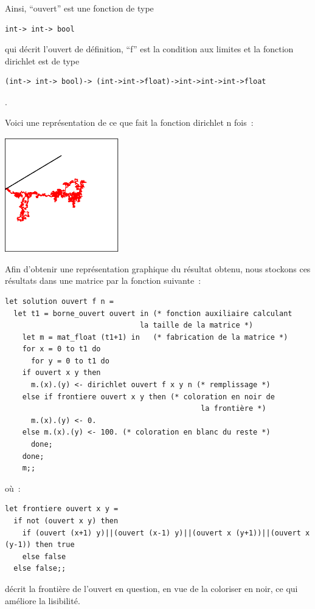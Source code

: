 Ainsi, ``ouvert'' est une fonction de type \begin{verbatim}int-> int-> bool\end{verbatim} qui décrit
l'ouvert de définition, ``f'' est la condition aux limites et la fonction dirichlet est de type \begin{verbatim}(int-> int-> bool)-> (int->int->float)->int->int->int->float\end{verbatim}.\par
Voici une représentation de ce que fait la fonction dirichlet n fois~:\par
\centerline{\includegraphics*[width=5cm,height=5cm]{images/marche_sortie.ps}}
Afin d'obtenir une représentation graphique du résultat obtenu, nous stockons ces résultats dans une matrice par la fonction suivante~:\par
\begin{verbatim}
let solution ouvert f n =
  let t1 = borne_ouvert ouvert in (* fonction auxiliaire calculant
                               la taille de la matrice *)
    let m = mat_float (t1+1) in   (* fabrication de la matrice *)
    for x = 0 to t1 do
      for y = 0 to t1 do
	if ouvert x y then 
	  m.(x).(y) <- dirichlet ouvert f x y n (* remplissage *)
	else if frontiere ouvert x y then (* coloration en noir de
                                             la frontière *)
	  m.(x).(y) <- 0.     
	else m.(x).(y) <- 100. (* coloration en blanc du reste *)
      done;
    done;
    m;;
\end{verbatim}\par
o\`u~:\par
\begin{verbatim}
let frontiere ouvert x y =
  if not (ouvert x y) then
    if (ouvert (x+1) y)||(ouvert (x-1) y)||(ouvert x (y+1))||(ouvert x (y-1)) then true
    else false
  else false;;
\end{verbatim}\par
décrit la frontière de l'ouvert en question, en vue de la coloriser en noir, ce qui améliore la lisibilité.\par
